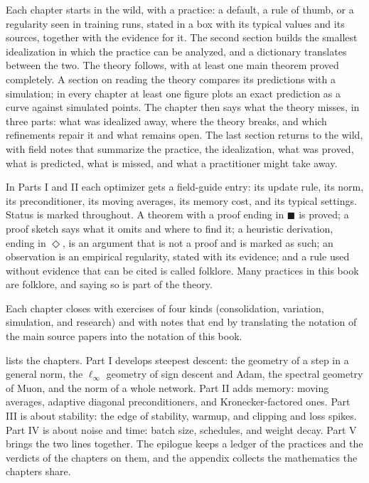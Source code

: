 \begin{refsection}

Each chapter starts in the wild, with a practice: a default, a rule of thumb, or a regularity seen in training runs, stated in a box with its typical values and its sources, together with the evidence for it. The second section builds the smallest idealization in which the practice can be analyzed, and a dictionary translates between the two. The theory follows, with at least one main theorem proved completely. A section on reading the theory compares its predictions with a simulation; in every chapter at least one figure plots an exact prediction as a curve against simulated points. The chapter then says what the theory misses, in three parts: what was idealized away, where the theory breaks, and which refinements repair it and what remains open. The last section returns to the wild, with field notes that summarize the practice, the idealization, what was proved, what is predicted, what is missed, and what a practitioner might take away.

In Parts I and II each optimizer gets a field-guide entry: its update rule, its norm, its preconditioner, its moving averages, its memory cost, and its typical settings. Status is marked throughout. A theorem with a proof ending in $\blacksquare$ is proved; a proof sketch says what it omits and where to find it; a heuristic derivation, ending in $\Diamond$, is an argument that is not a proof and is marked as such; an observation is an empirical regularity, stated with its evidence; and a rule used without evidence that can be cited is called folklore. Many practices in this book are folklore, and saying so is part of the theory.

Each chapter closes with exercises of four kinds (consolidation, variation, simulation, and research) and with notes that end by translating the notation of the main source papers into the notation of this book.


 lists the chapters. Part I develops steepest descent: the geometry of a step in a general norm, the $\ell_\infty$ geometry of sign descent and Adam, the spectral geometry of Muon, and the norm of a whole network. Part II adds memory: moving averages, adaptive diagonal preconditioners, and Kronecker-factored ones. Part III is about stability: the edge of stability, warmup, and clipping and loss spikes. Part IV is about noise and time: batch size, schedules, and weight decay. Part V brings the two lines together. The epilogue keeps a ledger of the practices and the verdicts of the chapters on them, and the appendix collects the mathematics the chapters share.


\end{refsection}
